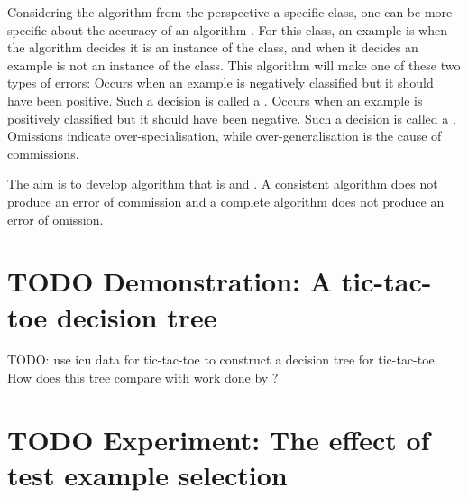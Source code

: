 Considering the algorithm from the perspective a specific class, one can be more specific about the accuracy of an algorithm \cite{kubat:review}. For this class, an example is  when the algorithm decides it is an instance of the class, and  when it decides an example is not an instance of the class. This algorithm will make one of these two types of errors:
 {Occurs when an example is negatively classified but it should have been positive.  Such a decision is called a .}
 {Occurs when an example is positively classified but it should have been negative.  Such a decision is called a .}
Omissions indicate over-specialisation, while over-generalisation is the cause of commissions. 

The aim is to develop algorithm that is  and . A consistent algorithm does not produce an error of commission and a complete algorithm does not produce an error of omission.   


\section{TODO Demonstration: A tic-tac-toe decision tree}
TODO: use icu data for tic-tac-toe \cite{icu:data} to construct a decision tree for tic-tac-toe.  How does this tree compare with work done by \cite{utgoff:feature}?

\section{TODO Experiment: The effect of test example selection} %
